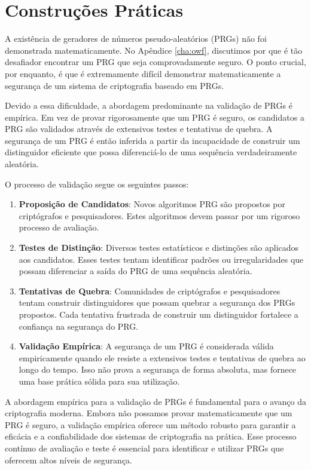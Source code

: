\section{Construções Práticas}
\label{sec:construcoes-praticas}

A existência de geradores de números pseudo-aleatórios (PRGs) não foi demonstrada matematicamente.
No Apêndice \ref{cha:owf}, discutimos por que é tão desafiador encontrar um PRG que seja comprovadamente seguro.
O ponto crucial, por enquanto, é que é extremamente difícil demonstrar matematicamente a segurança de um sistema de criptografia baseado em PRGs.

Devido a essa dificuldade, a abordagem predominante na validação de PRGs é empírica.
Em vez de provar rigorosamente que um PRG é seguro, os candidatos a PRG são validados através de extensivos testes e tentativas de quebra.
A segurança de um PRG é então inferida a partir da incapacidade de construir um distinguidor eficiente que possa diferenciá-lo de uma sequência verdadeiramente aleatória.

O processo de validação segue os seguintes passos:
\begin{enumerate}
\item \textbf{Proposição de Candidatos}:
  Novos algoritmos PRG são propostos por criptógrafos e pesquisadores.
  Estes algoritmos devem passar por um rigoroso processo de avaliação.
\item \textbf{Testes de Distinção}:
  Diversos testes estatísticos e distinções são aplicados aos candidatos.
  Esses testes tentam identificar padrões ou irregularidades que possam diferenciar a saída do PRG de uma sequência aleatória.
\item \textbf{Tentativas de Quebra}:
  Comunidades de criptógrafos e pesquisadores tentam construir distinguidores que possam quebrar a segurança dos PRGs propostos.
  Cada tentativa frustrada de construir um distinguidor fortalece a confiança na segurança do PRG.
\item \textbf{Validação Empírica}:
  A segurança de um PRG é considerada válida empiricamente quando ele resiste a extensivos testes e tentativas de quebra ao longo do tempo.
  Isso não prova a segurança de forma absoluta, mas fornece uma base prática sólida para sua utilização.
\end{enumerate}

A abordagem empírica para a validação de PRGs é fundamental para o avanço da criptografia moderna.
Embora não possamos provar matematicamente que um PRG é seguro, a validação empírica oferece um método robusto para garantir a eficácia e a confiabilidade dos sistemas de criptografia na prática.
Esse processo contínuo de avaliação e teste é essencial para identificar e utilizar PRGs que oferecem altos níveis de segurança.

